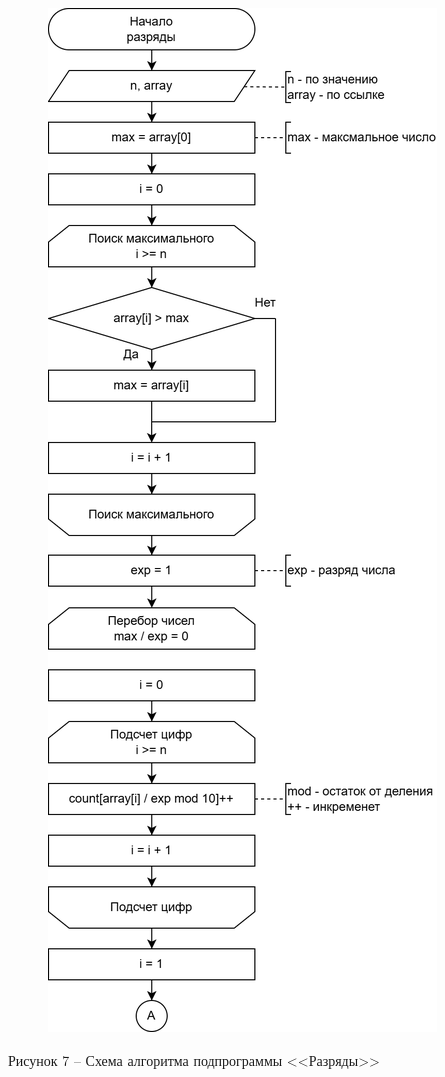 \documentclass[a4paper,14pt]{extarticle}
\begin{document}
	\pagebreak
	\begin{figure}[h]
		\centering
		\includegraphics[width=0.43\linewidth]{images/s-2-3}
	\end{figure}
	\begin{center}
		Рисунок 7 – Схема алгоритма подпрограммы <<Разряды>>
	\end{center}
\end{document}
